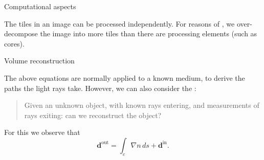  {Computational aspects}

The tiles in an image can be processed independently. For reasons of
, we over-decompose the image into more
tiles than there are processing elements (such as cores).

 {Volume reconstruction}

The above equations are normally applied to a known medium, to derive
the paths the light rays take. However, we can also consider the
:
\begin{quotation}
  Given an unknown object, with known rays entering, and measurements of
  rays exiting: can we reconstruct the object?
\end{quotation}
For this we observe that
\begin{equation}
  \mathbf{d}^{\scriptstyle\mathrm{out}} =
  \int_c \nabla n\, ds
  +
  \mathbf{d}^{\scriptstyle\mathrm{in}}.
\end{equation}



